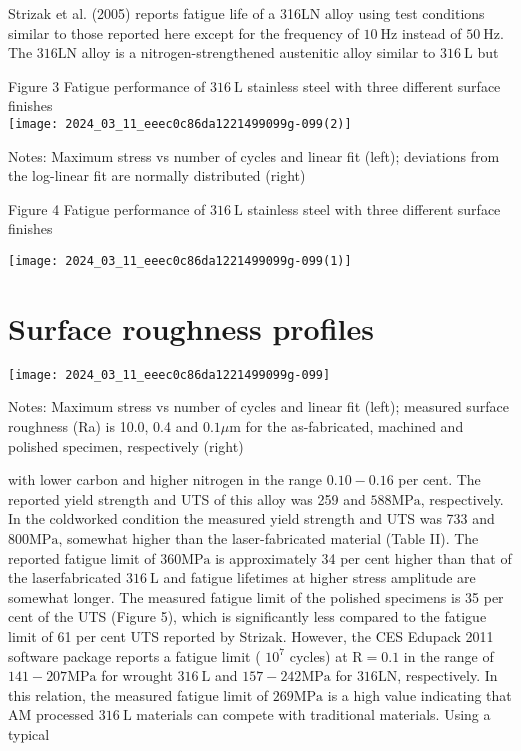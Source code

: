 \documentclass[10pt]{article}
\begin{document}
Strizak et al. (2005) reports fatigue life of a 316LN alloy using test conditions similar to those reported here except for the frequency of $10 \mathrm{~Hz}$ instead of $50 \mathrm{~Hz}$. The $316 \mathrm{LN}$ alloy is a nitrogen-strengthened austenitic alloy similar to $316 \mathrm{~L}$ but

Figure 3 Fatigue performance of $316 \mathrm{~L}$ stainless steel with three different surface finishes\\
\texttt{[image: 2024\_03\_11\_eeec0c86da1221499099g-099(2)]}

Notes: Maximum stress vs number of cycles and linear fit (left); deviations from the log-linear fit are normally distributed (right)

Figure 4 Fatigue performance of $316 \mathrm{~L}$ stainless steel with three different surface finishes

\begin{center}
\texttt{[image: 2024\_03\_11\_eeec0c86da1221499099g-099(1)]}
\end{center}

\section*{Surface roughness profiles}
\begin{center}
\texttt{[image: 2024\_03\_11\_eeec0c86da1221499099g-099]}
\end{center}

Notes: Maximum stress vs number of cycles and linear fit (left); measured surface roughness (Ra) is 10.0, 0.4 and $0.1 \mu \mathrm{m}$ for the as-fabricated, machined and polished specimen, respectively (right)

with lower carbon and higher nitrogen in the range $0.10-0.16$ per cent. The reported yield strength and UTS of this alloy was 259 and $588 \mathrm{MPa}$, respectively. In the coldworked condition the measured yield strength and UTS was 733 and $800 \mathrm{MPa}$, somewhat higher than the laser-fabricated material (Table II). The reported fatigue limit of $360 \mathrm{MPa}$ is approximately 34 per cent higher than that of the laserfabricated $316 \mathrm{~L}$ and fatigue lifetimes at higher stress amplitude are somewhat longer. The measured fatigue limit of the polished specimens is 35 per cent of the UTS (Figure 5), which is significantly less compared to the fatigue limit of 61 per cent UTS reported by Strizak. However, the CES Edupack 2011 software package reports a fatigue limit ( $10^{7}$ cycles) at $\mathrm{R}=0.1$ in the range of $141-207 \mathrm{MPa}$ for wrought $316 \mathrm{~L}$ and $157-242 \mathrm{MPa}$ for $316 \mathrm{LN}$, respectively. In this relation, the measured fatigue limit of $269 \mathrm{MPa}$ is a high value indicating that AM processed $316 \mathrm{~L}$ materials can compete with traditional materials. Using a typical
\end{document}
